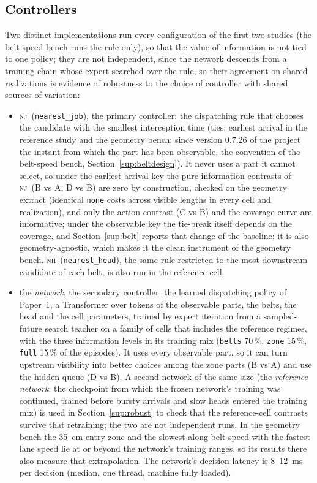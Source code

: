 \documentclass[11pt,a4paper]{article}
\newcommand{\nj}{\textsc{nj}}
\newcommand{\nh}{\textsc{nh}}
\begin{document}
\subsection{Controllers}\label{sup:controllers}
Two distinct implementations run every configuration of the first two studies (the
belt-speed bench runs the rule only), so that the value of information is not tied to one
policy; they are not independent, since the network descends from a training chain whose
expert searched over the rule, so their agreement on shared realizations is evidence of
robustness to the choice of controller with shared sources of variation:
\begin{itemize}[nosep]
\item \nj\ (\texttt{nearest\_job}), the primary controller: the dispatching rule that
  chooses the candidate with the smallest interception time (ties: earliest arrival in
  the reference study and the geometry bench; since version 0.7.26 of the project the
  instant from which the part has been observable, the convention of the belt-speed
  bench, Section~\ref{sup:beltdesign}). It
  never uses a part it cannot select, so under the earliest-arrival key the
  pure-information contrasts of \nj\ (B vs A, D vs B) are zero by construction, checked
  on the geometry extract (identical \texttt{none} costs across visible lengths in every
  cell and realization), and only the action contrast (C vs B) and the coverage curve
  are informative; under the observable key the tie-break itself depends on the
  coverage, and Section~\ref{sup:belt} reports that change of the baseline; it is also geometry-agnostic, which makes it the clean
  instrument of the geometry bench. \nh\ (\texttt{nearest\_head}), the same rule restricted
  to the most downstream candidate of each belt, is also run in the reference cell.
\item the \emph{network}, the secondary controller: the learned dispatching policy of
  Paper~1, a Transformer over tokens of the observable parts, the belts, the head and the
  cell parameters, trained by expert iteration from a sampled-future search teacher on a
  family of cells that includes the reference regimes, with the three information levels
  in its training mix (\texttt{belts} 70\,\%, \texttt{zone} 15\,\%, \texttt{full} 15\,\%
  of the episodes). It uses every observable part, so it can turn upstream visibility into
  better choices among the zone parts (B vs A) and use the hidden queue (D vs B). A second
  network of the same size (the \emph{reference network}: the checkpoint from which the
  frozen network's training was continued, trained before bursty arrivals and slow heads
  entered the training mix) is used in Section~\ref{sup:robust} to check that the
  reference-cell contrasts survive that retraining; the two are not independent runs. In
  the geometry bench the 35~cm entry zone and the slowest along-belt speed with the fastest
  lane speed lie at or beyond the network's training ranges, so its results there also
  measure that extrapolation. The network's decision latency is 8--12~ms per decision
  (median, one thread, machine fully loaded).
\end{itemize}
\end{document}
